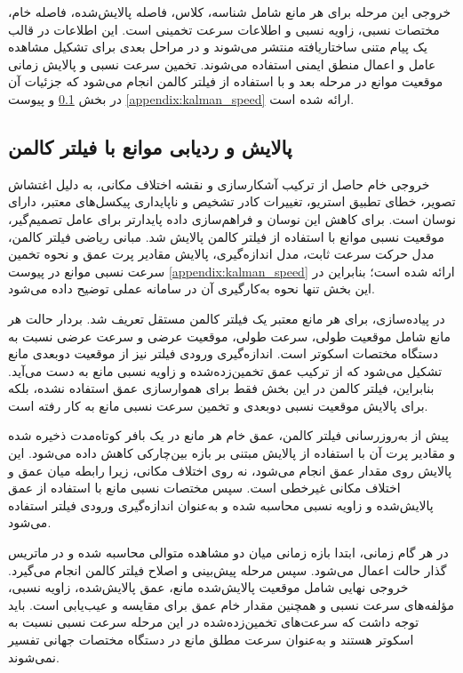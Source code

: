 خروجی این مرحله برای هر مانع شامل شناسه، کلاس، فاصله پالایش‌شده، فاصله خام، مختصات نسبی، زاویه نسبی و اطلاعات سرعت تخمینی است. این اطلاعات در قالب یک پیام متنی ساختاریافته منتشر می‌شوند و در مراحل بعدی برای تشکیل مشاهده عامل و اعمال منطق ایمنی استفاده می‌شوند. تخمین سرعت نسبی و پالایش زمانی موقعیت موانع در مرحله بعد و با استفاده از فیلتر کالمن انجام می‌شود که جزئیات آن در بخش \ref{subsec:real_obstacle_kalman_filtering} و پیوست \ref{appendix:kalman_speed} ارائه شده است.

\subsection{پالایش و ردیابی موانع با فیلتر کالمن}
\label{subsec:real_obstacle_kalman_filtering}

خروجی خام حاصل از ترکیب آشکارسازی  و نقشه اختلاف مکانی، به دلیل اغتشاش تصویر، خطای تطبیق استریو، تغییرات کادر تشخیص و ناپایداری پیکسل‌های معتبر، دارای نوسان است. برای کاهش این نوسان و فراهم‌سازی داده پایدارتر برای عامل تصمیم‌گیر، موقعیت نسبی موانع با استفاده از فیلتر کالمن پالایش شد. مبانی ریاضی فیلتر کالمن، مدل حرکت سرعت ثابت، مدل اندازه‌گیری، پالایش مقادیر پرت عمق و نحوه تخمین سرعت نسبی موانع در پیوست \ref{appendix:kalman_speed} ارائه شده است؛ بنابراین در این بخش تنها نحوه به‌کارگیری آن در سامانه عملی توضیح داده می‌شود.

در پیاده‌سازی، برای هر مانع معتبر یک فیلتر کالمن مستقل تعریف شد. بردار حالت هر مانع شامل موقعیت طولی، سرعت طولی، موقعیت عرضی و سرعت عرضی نسبت به دستگاه مختصات اسکوتر است. اندازه‌گیری ورودی فیلتر نیز از موقعیت دوبعدی مانع تشکیل می‌شود که از ترکیب عمق تخمین‌زده‌شده و زاویه نسبی مانع به دست می‌آید. بنابراین، فیلتر کالمن در این بخش فقط برای هموارسازی عمق استفاده نشده، بلکه برای پالایش موقعیت نسبی دوبعدی و تخمین سرعت نسبی مانع به کار رفته است.

پیش از به‌روزرسانی فیلتر کالمن، عمق خام هر مانع در یک بافر کوتاه‌مدت ذخیره شده و مقادیر پرت آن با استفاده از پالایش مبتنی بر بازه بین‌چارکی  کاهش داده می‌شود. این پالایش روی مقدار عمق انجام می‌شود، نه روی اختلاف مکانی، زیرا رابطه میان عمق و اختلاف مکانی غیرخطی است. سپس مختصات نسبی مانع با استفاده از عمق پالایش‌شده و زاویه نسبی محاسبه شده و به‌عنوان اندازه‌گیری ورودی فیلتر استفاده می‌شود.

در هر گام زمانی، ابتدا بازه زمانی میان دو مشاهده متوالی محاسبه شده و در ماتریس گذار حالت اعمال می‌شود. سپس مرحله پیش‌بینی و اصلاح فیلتر کالمن انجام می‌گیرد. خروجی نهایی شامل موقعیت پالایش‌شده مانع، عمق پالایش‌شده، زاویه نسبی، مؤلفه‌های سرعت نسبی و همچنین مقدار خام عمق برای مقایسه و عیب‌یابی است. باید توجه داشت که سرعت‌های تخمین‌زده‌شده در این مرحله سرعت نسبی نسبت به اسکوتر هستند و به‌عنوان سرعت مطلق مانع در دستگاه مختصات جهانی تفسیر نمی‌شوند.


